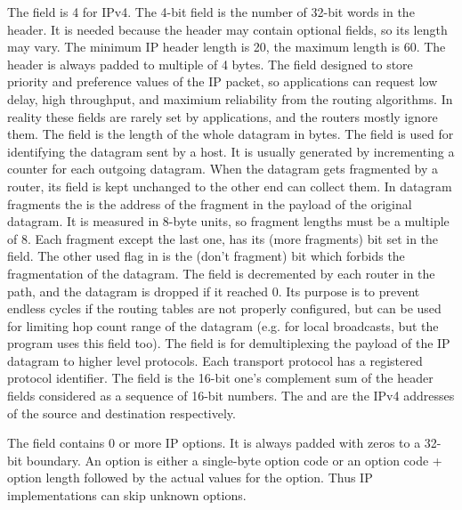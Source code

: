 The  field is 4 for IPv4. The 4-bit  field is the
number of 32-bit words in the header. It is needed because the header
may contain optional fields, so its length may vary. The minimum IP header
length is 20, the maximum length is 60. The header is always padded to
multiple of 4 bytes. The  field designed to store
priority and preference values of the IP packet, so applications can
request low delay, high throughput, and maximium reliability from the
routing algorithms. In reality these fields are rarely set by applications,
and the routers mostly ignore them. The  field is the
length of the whole datagram in bytes. The  field
is used for identifying the datagram sent by a host. It is usually generated
by incrementing a counter for each outgoing datagram. When the datagram
gets fragmented by a router, its  field is kept unchanged
to the other end can collect them. In datagram fragments the 
is the address of the fragment in the payload of the original datagram. It is
measured in 8-byte units, so fragment lengths must be a multiple of 8.
Each fragment except the last one, has its  (more fragments) bit set
in the  field. The other used flag in  is the 
(don't fragment) bit which forbids the fragmentation of the datagram.
The  field is decremented by each router in the path,
and the datagram is dropped if it reached 0. Its purpose is to prevent
endless cycles if the routing tables are not properly configured, but
can be used for limiting hop count range of the datagram (e.g. for local
broadcasts, but the  program uses this field too).
The  field is for demultiplexing the payload of the IP
datagram to higher level protocols. Each transport protocol has a registered
protocol identifier. The  field is the 16-bit one's
complement sum of the header fields considered as a sequence of 16-bit numbers.
The  and  are the IPv4 addresses
of the source and destination respectively.

The  field contains 0 or more IP options. It is always padded
with zeros to a 32-bit boundary. An option is either a single-byte option
code or an option code + option length followed by the actual values for
the option. Thus IP implementations can skip unknown options.

